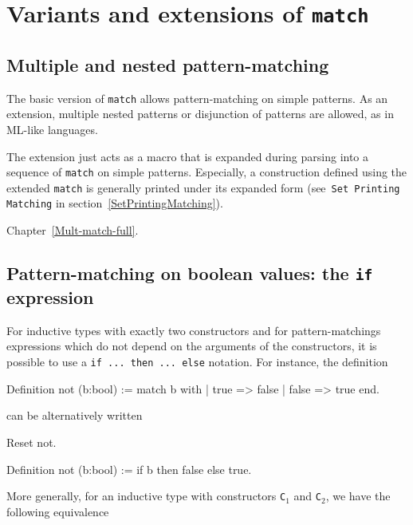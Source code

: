 \section{Variants and extensions of {\mbox{\tt match}}
\label{Extensions-of-match}
}

\subsection{Multiple and nested pattern-matching
\label{Mult-match}}

The basic version of \verb+match+ allows pattern-matching on simple
patterns. As an extension, multiple nested patterns or disjunction of
patterns are allowed, as in ML-like languages.

The extension just acts as a macro that is expanded during parsing
into a sequence of {\tt match} on simple patterns. Especially, a
construction defined using the extended {\tt match} is generally
printed under its expanded form (see~\texttt{Set Printing Matching} in
section~\ref{SetPrintingMatching}).

\SeeAlso Chapter~\ref{Mult-match-full}.

\subsection{Pattern-matching on boolean values: the {\tt if} expression
\label{if-then-else}
}

For inductive types with exactly two constructors and for
pattern-matchings expressions which do not depend on the arguments of
the constructors, it is possible to use a {\tt if ... then ... else}
notation. For instance, the definition

\begin{coq_example}
Definition not (b:bool) :=
  match b with
  | true => false
  | false => true
  end.
\end{coq_example}

\noindent can be alternatively written

\begin{coq_eval}
Reset not.
\end{coq_eval}
\begin{coq_example}
Definition not (b:bool) := if b then false else true.
\end{coq_example}

More generally, for an inductive type with constructors {\tt C$_1$}
and {\tt C$_2$}, we have the following equivalence

